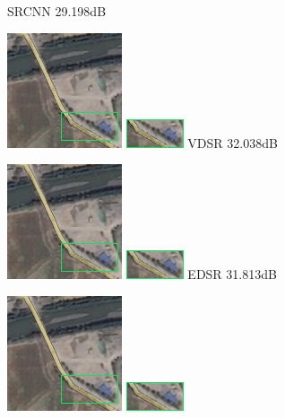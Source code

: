 \documentclass[runningheads,a4paper]{llncs}
\begin{document}
\begin{figure}[htbp]
\begin{minipage}{1.3cm}
    {SRCNN \newline29.198dB}
    \end{minipage}
    \qquad
    \begin{minipage}{1.3cm}
     \includegraphics[scale=0.4]{pic/2x/vdsr/pick-518.png}
    \includegraphics[scale=0.8]{pic/2x/vdsr/small-518.png}
    {VDSR \newline32.038dB}
    \end{minipage}
    \qquad
    \begin{minipage}{1.3cm}
     \includegraphics[scale=0.4]{pic/2x/edsr/pick-518.png}
    \includegraphics[scale=0.8]{pic/2x/edsr/small-518.png}
    {EDSR \newline31.813dB}
    \end{minipage}
    \qquad
    \begin{minipage}{1.3cm}
    \includegraphics[scale=0.4]{pic/2x/dcer/pick-518.png}
    \includegraphics[scale=0.8]{pic/2x/dcer/small-518.png}

\end{minipage}
\end{figure}
\end{document}
